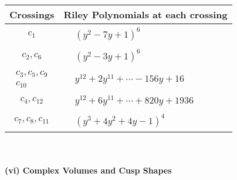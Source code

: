 \documentclass[1p]{elsarticle_modified}
\theoremstyle{definition}
\begin{document}
\begin{tabular}{m{50pt}|m{274pt}}
Crossings & \hspace{64pt}Riley Polynomials at each crossing \\
\hline $$\begin{aligned}c_{1}\end{aligned}$$&$\begin{aligned}
&(y^2-7 y+1)^6
\end{aligned}$\\
\hline $$\begin{aligned}c_{2},c_{6}\end{aligned}$$&$\begin{aligned}
&(y^2-3 y+1)^6
\end{aligned}$\\
\hline $$\begin{aligned}c_{3},c_{5},c_{9}\\c_{10}\end{aligned}$$&$\begin{aligned}
&y^{12}+2 y^{11}+\cdots-156 y+16
\end{aligned}$\\
\hline $$\begin{aligned}c_{4},c_{12}\end{aligned}$$&$\begin{aligned}
&y^{12}+6 y^{11}+\cdots+820 y+1936
\end{aligned}$\\
\hline $$\begin{aligned}c_{7},c_{8},c_{11}\end{aligned}$$&$\begin{aligned}
&(y^3+4 y^2+4 y-1)^4
\end{aligned}$\\
\hline
\end{tabular}\\~\\
\newpage\flushleft \textbf{(vi) Complex Volumes and Cusp Shapes}
\end{document}
